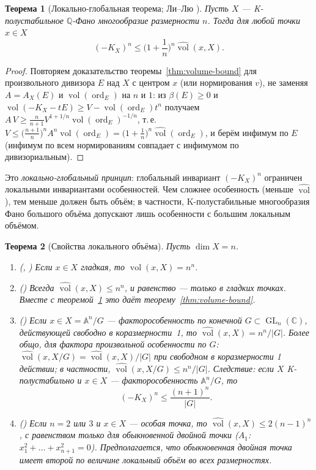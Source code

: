 \documentclass[11pt,a4paper]{article}
\theoremstyle{plain}
\newtheorem{theorem}{Теорема}[section]
\theoremstyle{definition}
\theoremstyle{remark}
\renewcommand{\C}{\mathbb{C}}
\newcommand{\Q}{\mathbb{Q}}
\newcommand{\A}{\mathbb{A}}
\DeclareMathOperator{\ord}{ord}
\DeclareMathOperator{\GL}{GL}
\DeclareMathOperator{\vol}{vol}
\newcommand{\hvol}{\widehat{\vol}}
\begin{document}
\begin{theorem}[{Локально-глобальная теорема; Ли--Лю \cite{LL19}}]\label{thm:local-global}
Пусть $X$ --- K-полустабильное $\Q$-Фано многообразие размерности $n$. Тогда для любой точки
$x\in X$
\[
(-K_X)^n\le\Big(1+\frac1n\Big)^n\hvol(x,X) .
\]
\end{theorem}
\begin{proof}
Повторяем доказательство теоремы~\ref{thm:volume-bound} для произвольного дивизора $E$ над $X$ с
центром $x$ (или нормирования $v$), не заменяя $A=A_X(E)$ и $\vol(\ord_E)$ на $n$ и $1$:
из $\beta(E)\ge0$ и $\vol(-K_X-tE)\ge V-\vol(\ord_E)t^n$ получаем
$A\,V\ge\frac n{n+1}V^{1+1/n}\vol(\ord_E)^{-1/n}$, т.\,е. $V\le\big(\frac{n+1}n\big)^nA^n\vol(\ord_E)=\big(1+\frac1n\big)^n\hvol(\ord_E)$,
и берём инфимум по $E$ (инфимум по всем нормированиям совпадает с инфимумом по дивизориальным).
\end{proof}

Это \emph{локально-глобальный принцип}: глобальный инвариант $(-K_X)^n$ ограничен локальными
инвариантами особенностей. Чем сложнее особенность (меньше $\hvol$), тем меньше должен быть объём; в
частности, K-полустабильные многообразия Фано большого объёма допускают лишь особенности с большим
локальным объёмом.

\begin{theorem}[{Свойства локального объёма}]\label{thm:nvol-properties}
Пусть $\dim X=n$.
\begin{enumerate}
\item \textup{(}\cite{dFEM}, \cite{Li18}\textup{)} Если $x\in X$ гладкая, то $\hvol(x,X)=n^n$.
\item \textup{(}\cite{LX19}\textup{)} Всегда $\hvol(x,X)\le n^n$, и равенство --- только в гладких точках. Вместе с
теоремой~\ref{thm:local-global} это даёт теорему~\ref{thm:volume-bound}.
\item \textup{(}\cite{Liu18}\textup{)} Если $x\in X=\A^n/G$ --- факторособенность по конечной $G\subset\GL_n(\C)$,
действующей свободно в коразмерности~1, то $\hvol(x,X)=n^n/|G|$. Более общо, для фактора
произвольной особенности по $G$: $\hvol(x,X/G)=\hvol(x,X)/|G|$ при свободном в коразмерности 1
действии; в частности, $\hvol(x,X/G)\le n^n/|G|$. Следствие: \emph{если $X$ K-полустабильно и
$x\in X$ --- факторособенность $\A^n/G$, то}
\begin{equation}\label{eq:quotient-bound}
(-K_X)^n\le\frac{(n+1)^n}{|G|} .
\end{equation}
\item \textup{(}\cite{LX19}\textup{)} Если $n=2$ или $3$ и $x\in X$ --- особая точка, то $\hvol(x,X)\le2(n-1)^n$,
с равенством только для обыкновенной двойной точки \textup{(}$A_1$: $x_1^2+\dots+x_{n+1}^2=0$\textup{)}.
Предполагается, что обыкновенная двойная точка имеет второй по величине локальный объём во всех
размерностях.
\end{enumerate}
\end{theorem}
\end{document}
